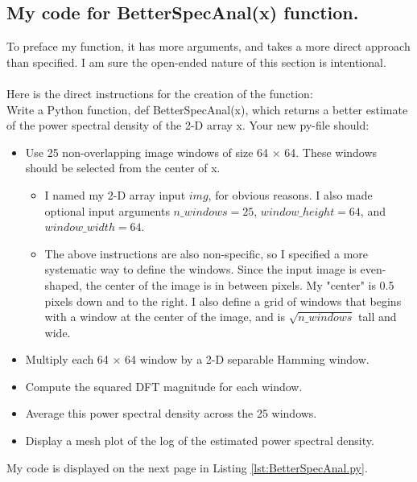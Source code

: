 \documentclass{article}
\begin{document}
\newpage
\subsection{My code for BetterSpecAnal(x) function.}
To preface my function, it has more arguments, and takes a more direct approach than specified. I am sure the open-ended nature of this section is intentional.\\
\\
Here is the direct instructions for the creation of the function:
\\
Write a Python function, def BetterSpecAnal(x), which returns a better estimate of the
power spectral density of the 2-D array x. Your new py-file should:
\begin{itemize}
    \item Use 25 non-overlapping image windows of size 64 × 64. These windows should be selected from the center of x.
    \begin{itemize}
        \item I named my 2-D array input $img$, for obvious reasons. I also made optional input arguments $n\_windows=25$, $window\_height=64$, and $window\_width=64$.
        \item The above instructions are also non-specific, so I specified a more systematic way to define the windows. Since the input image is even-shaped, the center of the image is in between pixels. My "center" is 0.5 pixels down and to the right. I also define a grid of windows that begins with a window at the center of the image, and is $\sqrt{n\_windows}$ tall and wide.
    \end{itemize}
    \item Multiply each 64 × 64 window by a 2-D separable Hamming window.
    \item Compute the squared DFT magnitude for each window.
    \item Average this power spectral density across the 25 windows.
    \item Display a mesh plot of the log of the estimated power spectral density.
\end{itemize}
My code is displayed on the next page in Listing \ref{lst:BetterSpecAnal.py}.
\newpage
\end{document}
